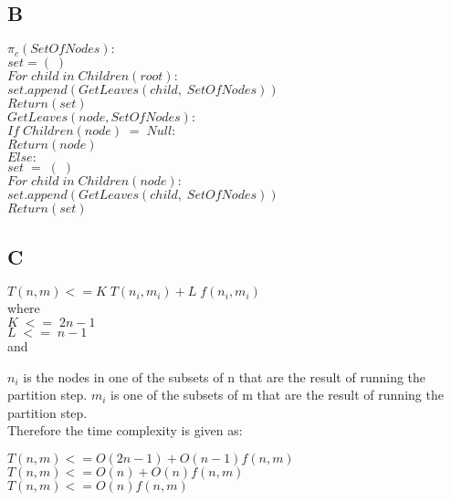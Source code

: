 \documentclass[paper=a4, fontsize=11pt]{scrartcl}
\newcommand\tab[1][1cm]{\hspace*{#1}}
\newcommand\dent[1][0.5cm]{\hspace*{#1}}
\numberwithin{equation}{section}		%
\numberwithin{figure}{section}			%
\numberwithin{table}{section}				%
\begin{document}
\subsection*{B}

\iffalse
Expand the partition step (given below) in pseudocode
compute πC = S1, S2, . . . Sr;
\fi


\dent$\pi_c(SetOfNodes):$\\
\tab$set = (\;)$\\
\tab$For\;child\;in\;Children(root):$\\
\tab\tab$set.append(GetLeaves(child,\;SetOfNodes))$\\
\tab$Return(set)$ \\

$GetLeaves(node,SetOfNodes):$\\
\tab$If\;Children(node)\;=\;Null:$\\
\tab\tab$Return(node)$\\
\tab$Else:$\\
\tab\tab$set\;=\;(\;)$\\
\tab\tab$For\;child\;in\;Children(node):$\\
\tab\tab\tab$set.append(GetLeaves(child,\;SetOfNodes))$\\
\tab\tab$Return(set)$

\subsection*{C}

\iffalse
Write a recurrence that expresses the running time of Build depending on the
number of different leaf-labels n and the number of constraints m. Use it to
estimate the running time of the algorithm assuming that the partitioning step
runs in time f (n, m) for some function monotonically nondecreasing function f.
\fi

\begin{center}
$T(n,m) <= K\;T(n_i,m_i) + L\;f(n_i,m_i)$\\
where\\
$K\;<=\;2n-1$\\
$L\;<=\;n-1$\\
and
\end{center}
$n_i$ is the nodes in one of the subsets of n that are the result of running the partition step. $m_i$ is one of the subsets of m that are the result of running the partition step.\\
Therefore the time complexity is given as:
\begin{center}
$T(n,m) <= O(2n-1) + O(n-1)f(n,m)$\\
$T(n,m) <= O(n) + O(n)f(n,m)$\\
$T(n,m) <= O(n)f(n,m)$
\end{center}
\end{document}

